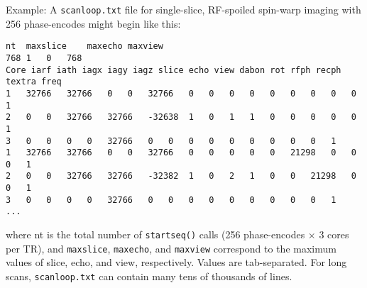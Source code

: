 Example: A {\tt scanloop.txt} file for single-slice, RF-spoiled spin-warp imaging with 256 phase-encodes might begin like this:
\begin{lstlisting}
nt	maxslice	maxecho	maxview
768	1	0	768	
Core iarf iath iagx iagy iagz slice echo view dabon rot rfph recph textra freq
1	32766	32766	0	0	32766	0	0	0	0	0	0	0	0	0	1
2	0	0	32766	32766	-32638	1	0	1	1	0	0	0	0	0	1
3	0	0	0	0	32766	0	0	0	0	0	0	0	0	0	1
1	32766	32766	0	0	32766	0	0	0	0	0	21298	0	0	0	1
2	0	0	32766	32766	-32382	1	0	2	1	0	0	21298	0	0	1
3	0	0	0	0	32766	0	0	0	0	0	0	0	0	0	1
...
\end{lstlisting}
where nt is the total number of {\tt startseq()} calls (256 phase-encodes $\times$ 3 cores per TR), and \texttt{maxslice}, \texttt{maxecho}, and \texttt{maxview} correspond to the maximum values of slice, echo, and view, respectively. %
Values are tab-separated.
For long scans, {\tt scanloop.txt} can contain many tens of thousands of lines.







